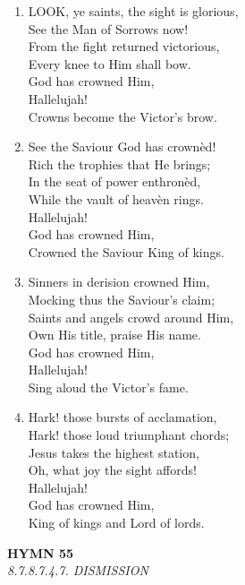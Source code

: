 \documentclass[11pt,a4paper]{article}
\begin{document}
\begin{enumerate}
    \item LOOK, ye saints, the sight is glorious, \\
        See the Man of Sorrows now! \\
        From the fight returned victorious, \\
        Every knee to Him shall bow. \\
        God has crowned Him, \\
        Hallelujah! \\
        Crowns become the Victor's brow.

    \item See the Saviour God has crown\`ed! \\
        Rich the trophies that He brings; \\
        In the seat of power enthron\`ed, \\
        While the vault of heav\`en rings. \\
        Hallelujah! \\
        God has crowned Him, \\
        Crowned the Saviour King of kings.

    \item Sinners in derision crowned Him, \\
        Mocking thus the Saviour's claim; \\
        Saints and angels crowd around Him, \\
        Own His title, praise His name. \\
        God has crowned Him, \\
        Hallelujah! \\
        Sing aloud the Victor's fame.

    \item Hark! those bursts of acclamation, \\
        Hark! those loud triumphant chords; \\
        Jesus takes the highest station, \\
        Oh, what joy the sight affords! \\
        Hallelujah! \\
        God has crowned Him, \\
        King of kings and Lord of lords.

\end{enumerate}

\newpage
\begin{center}
    {\Large \textbf{HYMN 55}}
    \\
    \textit{8.7.8.7.4.7. DISMISSION}
\end{center}
\vspace{1em}
\end{document}
